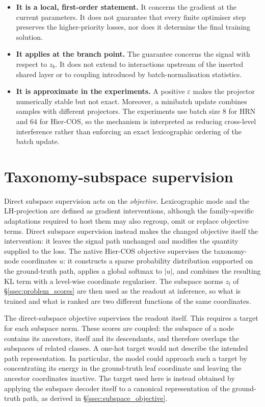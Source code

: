 \begin{itemize}
    \item \textbf{It is a local, first-order statement.} It concerns the gradient
    at the current parameters. It does not guarantee that every finite optimiser
    step preserves the higher-priority losses, nor does it determine the final
    training solution.
    \item \textbf{It applies at the branch point.} The guarantee concerns the
    signal with respect to $z_b$. It does not extend to interactions upstream of
    the inserted shared layer or to coupling introduced by batch-normalisation
    statistics.
    \item \textbf{It is approximate in the experiments.} A positive
    $\varepsilon$ makes the projector numerically stable but not exact. Moreover,
    a minibatch update combines samples with different projectors. The experiments
    use batch size $8$ for HRN and $64$ for Hier-COS, so the mechanism is
    interpreted as reducing cross-level interference rather than enforcing an
    exact lexicographic ordering of the batch update.
\end{itemize}
\section{Taxonomy-subspace supervision}
\label{sec:methodology_subspace}
\label{ssec:methodology_subspace_ce}

Direct subspace supervision acts on the \emph{objective}. Lexicographic mode and
the LH-projection are defined as gradient interventions, although the
family-specific adaptations required to host them may also regroup, omit or
replace objective terms. Direct subspace supervision instead makes the changed
objective itself the intervention: it leaves the signal path unchanged and
modifies the quantity supplied to the loss. The
native Hier-COS objective supervises the taxonomy-node coordinates $u$: it
constructs a sparse probability distribution supported on the ground-truth path,
applies a global softmax to $\lvert u\rvert$, and combines the resulting KL term
with a level-wise coordinate regulariser. The subspace norms $z_l$ of
\S\ref{ssec:problem_scores} are then used as the readout at inference, so what is
trained and what is ranked are two different functions of the same coordinates.

The direct-subspace objective supervises the readout itself. This requires a
target for each subspace norm. These scores are coupled: the subspace of a node
contains its ancestors, itself and its descendants, and therefore overlaps the
subspaces of related classes. A one-hot target would not describe the intended
path representation. In particular, the model could approach such a target by
concentrating its energy in the ground-truth leaf coordinate and leaving the
ancestor coordinates inactive. The target used here is instead obtained by
applying the subspace decoder itself to a canonical representation of the
ground-truth path, as derived in \S\ref{ssec:subspace_objective}.

